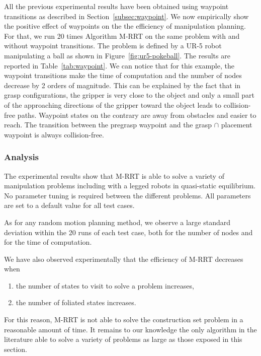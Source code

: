 All the previous experimental results have been obtained using
waypoint transitions as described in Section~\ref{subsec:waypoint}. We
now empirically show the positive effect of waypoints on the the
efficiency of manipulation planning. For that, we run 20 times
Algorithm M-RRT on the same problem with and without waypoint
transitions.  The problem is defined by a UR-5 robot manipulating a
ball as shown in Figure~\ref{fig:ur5-pokeball}. The results are
reported in Table~\ref{tab:waypoint}. We can notice that for this
example, the waypoint transitions make the time of computation and the
number of nodes decrease by 2 orders of magnitude. This can be
explained by the fact that in grasp configurations, the gripper is
very close to the object and only a small part of the approaching
directions of the gripper toward the object leads to collision-free
paths. Waypoint states on the contrary are away from obstacles and
easier to reach. The transition between the pregrasp waypoint and the
grasp $\cap$ placement waypoint is always collision-free.

\subsubsection{Analysis}

The experimental results show that M-RRT is able to solve a variety of
manipulation problems including with a legged robots in quasi-static
equilibrium. No parameter tuning is required between the different problems. All
parameters are set to a default value for all test cases.

As for any random motion planning method, we observe a large standard
deviation within the 20 runs of each test case, both for the number of nodes
and for the time of computation.

We have also observed experimentally that the efficiency of M-RRT decreases
when
\begin{enumerate}
\item the number of states to visit to solve a problem increases,
\item the number of foliated states increases.
\end{enumerate}
For this reason, M-RRT is not able to solve the construction set
problem in a reasonable amount of time. It remains to our knowledge
the only algorithm in the literature able to solve a variety of
problems as large as those exposed in this section.

